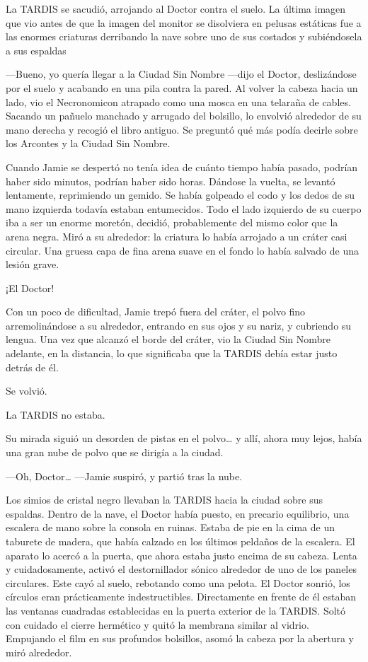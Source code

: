 La TARDIS se sacudió, arrojando al Doctor contra el suelo. La última
imagen que vio antes de que la imagen del monitor se disolviera en
pelusas estáticas fue a las enormes criaturas derribando la nave
sobre uno de sus costados y subiéndosela a sus espaldas

---Bueno, yo quería llegar a la Ciudad Sin Nombre ---dijo el Doctor,
deslizándose por el suelo y acabando en una pila contra la pared. Al
volver la cabeza hacia un lado, vio el Necronomicon atrapado como una
mosca en una telaraña de cables. Sacando un pañuelo manchado y arrugado
del bolsillo, lo envolvió alrededor de su mano derecha y recogió el
libro antiguo. Se preguntó qué más podía decirle sobre los Arcontes y la
Ciudad Sin Nombre.

Cuando Jamie se despertó no tenía idea de cuánto tiempo había pasado,
podrían haber sido minutos, podrían haber sido horas. Dándose la vuelta,
se levantó lentamente, reprimiendo un gemido. Se había golpeado el codo
y los dedos de su mano izquierda todavía estaban entumecidos. Todo el
lado izquierdo de su cuerpo iba a ser un enorme moretón, decidió,
probablemente del mismo color que la arena negra. Miró a su alrededor:
la criatura lo había arrojado a un cráter casi circular. Una gruesa capa
de fina arena suave en el fondo lo había salvado de una lesión grave.

¡El Doctor!

Con un poco de dificultad, Jamie trepó fuera del cráter, el polvo fino
arremolinándose a su alrededor, entrando en sus ojos y su nariz, y
cubriendo su lengua. Una vez que alcanzó el borde del cráter, vio la
Ciudad Sin Nombre adelante, en la distancia, lo que significaba que la
TARDIS debía estar justo detrás de él.

Se volvió.

La TARDIS no estaba.

Su mirada siguió un desorden de pistas en el polvo\ldots{} y allí, ahora
muy lejos, había una gran nube de polvo que se dirigía a la ciudad.

---Oh, Doctor\ldots{} ---Jamie suspiró, y partió tras la nube.

Los simios de cristal negro llevaban la TARDIS hacia la ciudad sobre sus
espaldas. Dentro de la nave, el Doctor había puesto, en
precario equilibrio, una escalera de mano sobre la consola en ruinas.
Estaba de pie en la cima de un taburete de madera, que había calzado en
los últimos peldaños de la escalera. El aparato lo acercó a la puerta,
que ahora estaba justo encima de su cabeza. Lenta y cuidadosamente,
activó el destornillador sónico alrededor de uno de los paneles
circulares. Este cayó al suelo, rebotando como una pelota. El Doctor
sonrió, los círculos eran prácticamente indestructibles. Directamente en
frente de él estaban las ventanas cuadradas establecidas en la puerta
exterior de la TARDIS. Soltó con cuidado el cierre hermético y quitó la
membrana similar al vidrio. Empujando el film en sus profundos
bolsillos, asomó la cabeza por la abertura y miró alrededor.

